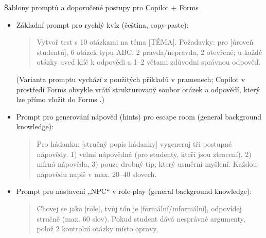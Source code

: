 \documentclass{report}%
\begin{document}
Šablony promptů a doporučené postupy pro Copilot + Forms
\begin{itemize}
  \item Základní prompt pro rychlý kvíz (čeština, copy‑paste):
    \begin{quote}
      
\begin{PromptBlock}


Vytvoř test s 10 otázkami na téma [TÉMA]. Požadavky: pro [úroveň studentů], 6 otázek typu ABC, 2 pravda/nepravda, 2 otevřené; u každé otázky uveď klíč k odpovědi a 1–2 větami zdůvodni správnou odpověď.
\end{PromptBlock}


    \end{quote}
    (Varianta promptu vychází z použitých příkladů v pramenech; Copilot v prostředí Forms obvykle vrátí strukturovaný soubor otázek a odpovědí, který lze přímo vložit do Forms \cite{kb_ai_101_tipu_pdf_04e4a115_page_36_1}.)
  \item Prompt pro generování nápověd (hints) pro escape room (general background knowledge):
    \begin{quote}
      
\begin{PromptBlock}


Pro hádanku: [stručný popis hádanky] vygeneruj tři postupné nápovědy. 1) velmi nápovědná (pro studenty, kteří jsou ztracení), 2) mírná nápověda, 3) pouze drobný tip, který usměrní myšlení. Každou nápovědu napiš v max. 20–40 slovech.
\end{PromptBlock}


    \end{quote}
  \item Prompt pro nastavení „NPC“ v role‑play (general background knowledge):
    \begin{quote}
      
\begin{PromptBlock}


Chovej se jako [role], tvůj tón je [formální/informální], odpovídej stručně (max. 60 slov). Pokud student dává nesprávné argumenty, polož 2 kontrolní otázky místo opravy.
\end{PromptBlock}


    \end{quote}
\end{itemize}
\end{document}
